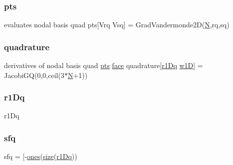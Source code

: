 \mbox{\label{a00473_a7d2fb616b76863109aa80a7ffdfad72b}} 
\subsubsection{\texorpdfstring{pts}{pts}}
{\footnotesize\ttfamily evaluates nodal basis quad pts\mbox{[}Vrq Vsq\mbox{]} = Grad\+Vandermonde2D(\hyperlink{a00473_a5b9c4563028063ee53b517cce9aa701b}{N},rq,sq)}

\mbox{\label{a00473_ac3595844f3ad3881eaa91da23069d5eb}} 
\subsubsection{\texorpdfstring{quadrature}{quadrature}}
{\footnotesize\ttfamily derivatives of nodal basis quad \hyperlink{a00473_a7d2fb616b76863109aa80a7ffdfad72b}{pts} \hyperlink{a00611_ac4ec0037ba529da25bf084669a45f60c}{face} quadrature\mbox{[}\hyperlink{a00473_a79d685dcbb9027705142b2a8b912aa1e}{r1\+Dq} \hyperlink{a00473_aa7de090b80d0a88d7d94e7763da3fe7e}{w1D}\mbox{]} = Jacobi\+GQ(0,0,ceil(3$\ast$\hyperlink{a00473_a5b9c4563028063ee53b517cce9aa701b}{N}+1))}

\mbox{\label{a00473_aed0fb0ce4332da27d943a566abf0bdb7}} 
\subsubsection{\texorpdfstring{r1\+Dq}{r1Dq}}
{\footnotesize\ttfamily r1\+Dq}

\mbox{\label{a00473_af5555ce3d578203ae1f6d0731e4f1170}} 
\subsubsection{\texorpdfstring{sfq}{sfq}}
{\footnotesize\ttfamily sfq = \mbox{[}-\/\hyperlink{a00473_a6d4fbbd46e46569dab2b0ad8372e0220}{ones}(\hyperlink{a00611_ad6cb0afbbe6ea4f56407890be2533966}{size}(\hyperlink{a00473_a79d685dcbb9027705142b2a8b912aa1e}{r1\+Dq}))}

